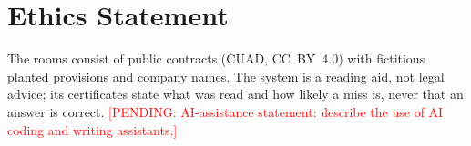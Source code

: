 \documentclass[11pt]{article}
\newcommand{\pending}[1]{\textcolor{red}{[PENDING: #1]}}   %
\begin{document}
\section*{Ethics Statement}
The rooms consist of public contracts (CUAD, CC~BY~4.0) with fictitious planted provisions and company names. The system is a reading aid, not legal advice; its certificates state what was read and how likely a miss is, never that an answer is correct. \pending{AI-assistance statement: describe the use of AI coding and writing assistants.}


\end{document}
